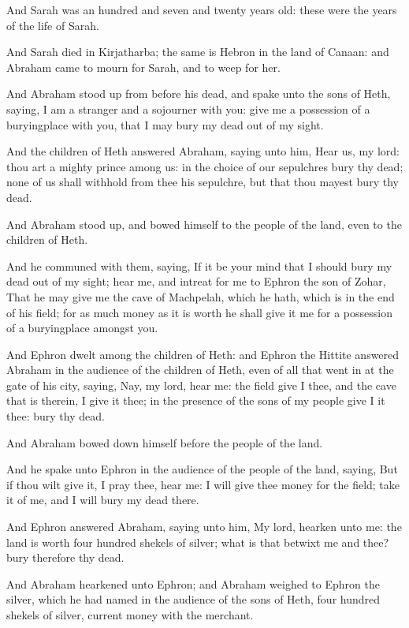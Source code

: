 \verse And Sarah was an hundred and seven and twenty years old: these
were the years of the life of Sarah.

\verse And Sarah died in Kirjatharba; the same is Hebron in the land of
Canaan: and Abraham came to mourn for Sarah, and to weep for her.

\verse And Abraham stood up from before his dead, and spake unto the
sons of Heth, saying, \verse I am a stranger and a sojourner with you:
give me a possession of a buryingplace with you, that I may bury my
dead out of my sight.

\verse And the children of Heth answered Abraham, saying unto him, \verse
Hear us, my lord: thou art a mighty prince among us: in the choice of
our sepulchres bury thy dead; none of us shall withhold from thee his
sepulchre, but that thou mayest bury thy dead.

\verse And Abraham stood up, and bowed himself to the people of the
land, even to the children of Heth.

\verse And he communed with them, saying, If it be your mind that I
should bury my dead out of my sight; hear me, and intreat for me to
Ephron the son of Zohar, \verse That he may give me the cave of
Machpelah, which he hath, which is in the end of his field; for as
much money as it is worth he shall give it me for a possession of a
buryingplace amongst you.

\verse And Ephron dwelt among the children of Heth: and Ephron the
Hittite answered Abraham in the audience of the children of Heth, even
of all that went in at the gate of his city, saying, \verse Nay, my
lord, hear me: the field give I thee, and the cave that is therein, I
give it thee; in the presence of the sons of my people give I it thee:
bury thy dead.

\verse And Abraham bowed down himself before the people of the land.

\verse And he spake unto Ephron in the audience of the people of the
land, saying, But if thou wilt give it, I pray thee, hear me: I will
give thee money for the field; take it of me, and I will bury my dead
there.

\verse And Ephron answered Abraham, saying unto him, \verse My lord,
hearken unto me: the land is worth four hundred shekels of silver;
what is that betwixt me and thee? bury therefore thy dead.

\verse And Abraham hearkened unto Ephron; and Abraham weighed to Ephron
the silver, which he had named in the audience of the sons of Heth,
four hundred shekels of silver, current money with the merchant.

